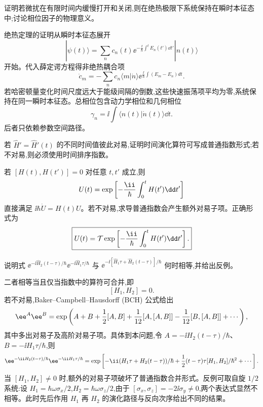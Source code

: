 \begin{question}
证明若微扰在有限时间内缓慢打开和关闭,则在绝热极限下系统保持在瞬时本征态中;讨论相位因子的物理意义。
\end{question}
\begin{solution}
绝热定理的证明从瞬时本征态展开
\[
|\psi(t)\rangle=\sum_n c_n(t)\ee^{-\frac{\ii}{\hbar}\int^t E_n(t')\dd t'}|n(t)\rangle
\]
开始。代入薛定谔方程得非绝热耦合项
\[
\dot c_m=-\sum_n c_n\langle m|\dot n\rangle \ee^{\frac{\ii}{\hbar}\int(E_m-E_n)dt}.
\]
若哈密顿量变化时间尺度远大于能级间隔的倒数,这些快速振荡项平均为零,系统保持在同一瞬时本征态。总相位包含动力学相位和几何相位
\[
\gamma_n=\ii\int\langle n(t)|\dot n(t)\rangle\dd t.
\]
后者只依赖参数空间路径。
\end{solution}

\begin{question}
若 $\hat H'=\hat H'(t)$ 的不同时间值彼此对易,证明时间演化算符可写成普通指数形式;若不对易,则必须使用时间排序指数。
\end{question}
\begin{solution}
若 $[H(t),H(t')]=0$ 对任意 $t,t'$ 成立,则
\[
U(t)=\exp\left[-{\ii\over\hbar}\int_0^t H(t')\dd t'\right]
\]
直接满足 $\ii\hbar\dot U=H(t)U$。若不对易,求导普通指数会产生额外对易子项。正确形式为
\[
\boxed{U(t)=\mathcal T\exp\left[-{\ii\over\hbar}\int_0^t H(t')\dd t'\right].}
\]
\end{solution}

\begin{question}
说明式 $\ee^{-\ii\hat H_2(t-\tau)/\hbar}\ee^{-\ii\hat H_1\tau/\hbar}$ 与 $\ee^{-\ii[\hat H_1\tau+\hat H_2(t-\tau)]/\hbar}$ 何时相等,并给出反例。
\end{question}
\begin{solution}
二者相等当且仅当指数中的算符可合并,即
\[
[H_1,H_2]=0.
\]
若不对易,Baker--Campbell--Hausdorff (BCH) 公式给出
\[
\ee^A\ee^B=\exp\left(A+B+{1\over2}[A,B]+{1\over12}[A,[A,B]]-{1\over12}[B,[A,B]]+\cdots\right),
\]
其中多出对易子及高阶对易子项。具体到本问题,令 $A=-\ii H_2(t-\tau)/\hbar$、$B=-\ii H_1\tau/\hbar$,则
\[
\ee^{-\ii H_2(t-\tau)/\hbar}\ee^{-\ii H_1\tau/\hbar}
=\exp\left[-\ii(H_1\tau+H_2(t-\tau))/\hbar
+{1\over2}(t-\tau)\tau[H_1,H_2]/\hbar^2+\cdots\right].
\]
当 $[H_1,H_2]\neq0$ 时,额外的对易子项破坏了普通指数合并形式。反例可取自旋 $1/2$ 系统:设 $H_1=\hbar\omega\sigma_x/2$,$H_2=\hbar\omega\sigma_z/2$,由于 $[\sigma_x,\sigma_z]=-2\ii\sigma_y\neq0$,两个表达式显然不相等。此时先后作用 $H_1$ 再 $H_2$ 的演化路径与反向次序给出不同的结果。
\end{solution}

